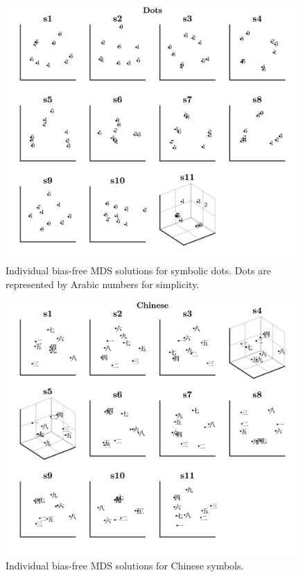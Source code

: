 \begin{figure}[tbh]
\centering \includegraphics[scale = .67]{Figures/Appendix/AppE/BiasFree_Indiv_MDS_2.jpg}
\caption{Individual bias-free MDS solutions for symbolic dots. Dots are represented by Arabic numbers for simplicity.}
\label{fig:Apx_MDSdots_Cross}
\end{figure}

\begin{figure}[tbh]
\centering \includegraphics[scale = .67]{Figures/Appendix/AppE/BiasFree_Indiv_MDS_3.jpg}
\caption{Individual bias-free MDS solutions for Chinese symbols.}
\label{fig:Apx_MDSchinese_Cross}
\end{figure}

